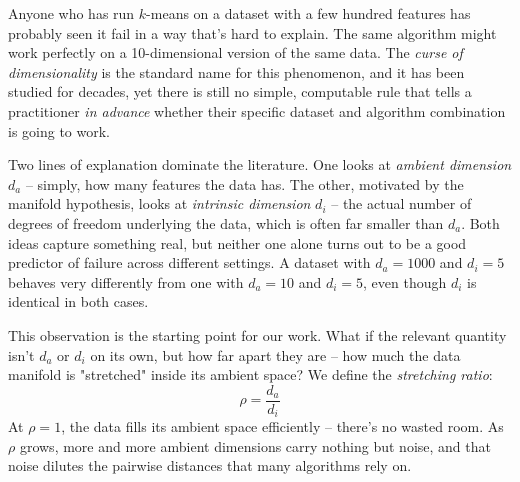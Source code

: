 \documentclass[pdflatex,sn-mathphys-num]{sn-jnl}
\theoremstyle{thmstyleone}
\begin{document}
Anyone who has run $k$-means on a dataset with a few hundred features has
probably seen it fail in a way that's hard to explain. The same algorithm
might work perfectly on a 10-dimensional version of the same data. The
\textit{curse of dimensionality} is the standard name for this phenomenon, and
it has been studied for decades, yet there is still no simple, computable rule
that tells a practitioner \textit{in advance} whether their specific dataset
and algorithm combination is going to work.

Two lines of explanation dominate the literature. One looks at \textit{ambient
dimension} $d_a$ -- simply, how many features the data has. The other,
motivated by the manifold hypothesis, looks at \textit{intrinsic dimension}
$d_i$ -- the actual number of degrees of freedom underlying the data, which is
often far smaller than $d_a$. Both ideas capture something real, but neither
one alone turns out to be a good predictor of failure across different
settings. A dataset with $d_a=1000$ and $d_i=5$ behaves very differently from
one with $d_a=10$ and $d_i=5$, even though $d_i$ is identical in both cases.

This observation is the starting point for our work. What if the relevant
quantity isn't $d_a$ or $d_i$ on its own, but how far apart they are --
how much the data manifold is "stretched" inside its ambient space? We define
the \textit{stretching ratio}:
\begin{equation}
    \rho = \frac{d_a}{d_i}
\end{equation}
At $\rho = 1$, the data fills its ambient space efficiently -- there's no
wasted room. As $\rho$ grows, more and more ambient dimensions carry nothing
but noise, and that noise dilutes the pairwise distances that many algorithms
rely on.
\end{document}
